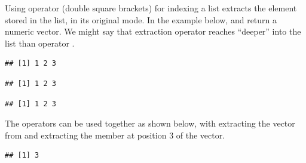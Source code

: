 \documentclass[krantz2]{krantz}\usepackage{knitr}
\begin{document}
Using operator \Roperator{[[]]} (double square brackets) for indexing a list extracts the element stored in the list, in its original mode. In the example below,  and  return a numeric vector. We might say that extraction operator \Roperator{[[]]} reaches ``deeper'' into the list than operator \Roperator{[]}.

\begin{knitrout}\footnotesize
{}\color{fgcolor}\begin{kframe}
\begin{alltt}
\hlopt{$}
\end{alltt}
\begin{verbatim}
## [1] 1 2 3
\end{verbatim}
\begin{alltt}
\hlstd{a.list[[}\hlstd{]]}
\end{alltt}
\begin{verbatim}
## [1] 1 2 3
\end{verbatim}
\begin{alltt}
\hlstd{a.list[[}\hlstd{]]}
\end{alltt}
\begin{verbatim}
## [1] 1 2 3
\end{verbatim}
\end{kframe}
\end{knitrout}

The operators can be used together as shown below, with  extracting the vector from  and \code{[3]} extracting the member at position 3 of the vector.

\begin{knitrout}\footnotesize
{}\color{fgcolor}\begin{kframe}
\begin{alltt}
\hlstd{a.list[[}\hlstd{]][}\hlstd{]}
\end{alltt}
\begin{verbatim}
## [1] 3
\end{verbatim}
\end{kframe}
\end{knitrout}
\end{document}
